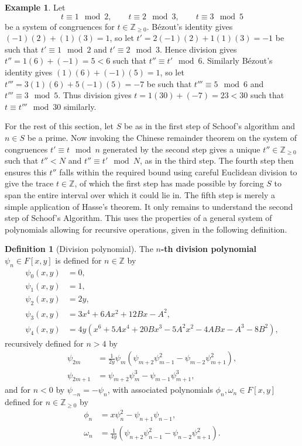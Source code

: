 \documentclass{article}
\newcommand{\Z}{\mathbb{Z}}
\newcommand{\rb}[1]{\left( #1 \right)}
\renewcommand{\sb}[1]{\left[ #1 \right]}
\theoremstyle{definition}\newtheorem*{definition}{Definition}
\theoremstyle{definition}\newtheorem*{example}{Example}
\theoremstyle{definition}\newtheorem*{remark}{Remark}
\begin{document}
\begin{example}
Let
$$ t \equiv 1 \mod 2, \qquad t \equiv 2 \mod 3, \qquad t \equiv 3 \mod 5 $$
be a system of congruences for $ t \in \Z_{\ge 0} $. Bézout's identity gives $ \rb{-1}\rb{2} + \rb{1}\rb{3} = 1 $, so let $ t' = 2\rb{-1}\rb{2} + 1\rb{1}\rb{3} = -1 $ be such that $ t' \equiv 1 \mod 2 $ and $ t' \equiv 2 \mod 3 $. Hence division gives $ t'' = 1\rb{6} + \rb{-1} = 5 < 6 $ such that $ t'' \equiv t' \mod 6 $. Similarly Bézout's identity gives $ \rb{1}\rb{6} + \rb{-1}\rb{5} = 1 $, so let $ t''' = 3\rb{1}\rb{6} + 5\rb{-1}\rb{5} = -7 $ be such that $ t''' \equiv 5 \mod 6 $ and $ t''' \equiv 3 \mod 5 $. Thus division gives $ t = 1\rb{30} + \rb{-7} = 23 < 30 $ such that $ t \equiv t''' \mod 30 $ similarly.
\end{example}

For the rest of this section, let $ S $ be as in the first step of Schoof's algorithm and $ n \in S $ be a prime. Now invoking the Chinese remainder theorem on the system of congruences $ t' \equiv t \mod n $ generated by the second step gives a unique $ t'' \in \Z_{\ge 0} $ such that $ t'' < N $ and $ t'' \equiv t' \mod N $, as in the third step. The fourth step then ensures this $ t'' $ falls within the required bound using careful Euclidean division to give the trace $ t \in \Z $, of which the first step has made possible by forcing $ S $ to span the entire interval over which it could lie in. The fifth step is merely a simple application of Hasse's theorem. It only remains to understand the second step of Schoof's Algorithm. This uses the properties of a general system of polynomials allowing for recursive operations, given in the following definition.

\begin{definition}[Division polynomial]
The \textbf{$ n $-th division polynomial} $ \psi_n \in F\sb{x, y} $ is defined for $ n \in \Z $ by
\begin{align*}
\psi_0\rb{x, y} & = 0, \\
\psi_1\rb{x, y} & = 1, \\
\psi_2\rb{x, y} & = 2y, \\
\psi_3\rb{x, y} & = 3x^4 + 6Ax^2 + 12Bx - A^2, \\
\psi_4\rb{x, y} & = 4y\rb{x^6 + 5Ax^4 + 20Bx^3 - 5A^2x^2 - 4ABx - A^3 - 8B^2},
\end{align*}
recursively defined for $ n > 4 $ by
\begin{align*}
\psi_{2m} & = \tfrac{1}{2y}\psi_m\rb{\psi_{m + 2}\psi_{m - 1}^2 - \psi_{m - 2}\psi_{m + 1}^2}, \\
\psi_{2m + 1} & = \psi_{m + 2}\psi_m^3 - \psi_{m - 1}\psi_{m + 1}^3,
\end{align*}
and for $ n < 0 $ by $ \psi_{-n} = -\psi_n $, with associated polynomials $ \phi_n, \omega_n \in F\sb{x, y} $ defined for $ n \in \Z_{\ge 0} $ by
\begin{align*}
\phi_n & = x\psi_n^2 - \psi_{n + 1}\psi_{n - 1}, \\
\omega_n & = \tfrac{1}{4y}\rb{\psi_{n + 2}\psi_{n - 1}^2 - \psi_{n - 2}\psi_{n + 1}^2}.
\end{align*}
\end{definition}
\end{document}
